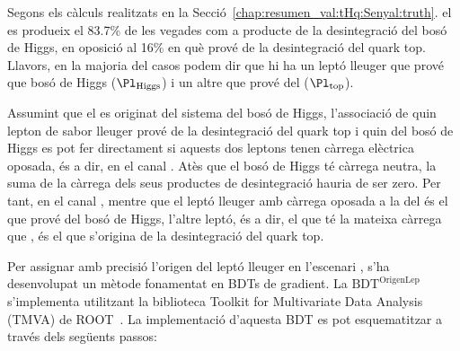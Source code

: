 Segons els càlculs realitzats en la Secció~\ref{chap:resumen_val:tHq:Senyal:truth}. el \tauhad es produeix el 83.7\%
de les vegades com a producte de la desintegració del bosó de Higgs, en oposició al 16\% en què prové de la desintegració
del quark top. Llavors, en la majoria del casos podem dir que hi ha un leptó lleuger que prové que bosó de Higgs ($\Pl_{\text{Higgs}}$)
i un altre que prové del ($\Pl_{\text{top}}$).

Assumint que el \tauhad es originat del sistema del bosó de Higgs, l'associació de quin lepton de sabor lleuger
prové de la desintegració del quark top i quin del bosó de Higgs es pot fer directament si aquests dos leptons
tenen càrrega elèctrica oposada, és a dir, en el canal \dilepOStau. Atès que el bosó de Higgs té càrrega neutra,
la suma de la càrrega dels seus productes de desintegració hauria de ser zero. Per tant, en el canal \dilepOStau,
mentre que el leptó lleuger amb càrrega oposada a la del \tauhad és el que prové del bosó de Higgs, l'altre leptó,
és a dir, el que té la mateixa càrrega que \tauhad, és el que s'origina de la desintegració del quark top.

Per assignar amb precisió l'origen del leptó lleuger
en l'escenari \dilepSStau, s'ha desenvolupat un mètode fonamentat en BDTs de gradient.
La $\text{BDT}^{\text{OrigenLep}}$ s'implementa utilitzant la biblioteca Toolkit for Multivariate Data Analysis (TMVA) de
ROOT~\cite{Brun:1997pa, TMVAUsersGuide}. La implementació d'aquesta BDT es pot esquematitzar
a través dels següents passos:


